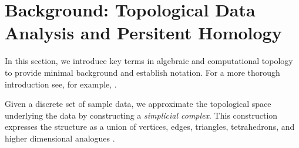 \section{Background: Topological Data Analysis and Persitent Homology}\label{background}
\label{sec:background}




In this section, we introduce key terms in algebraic and computational topology to provide minimal background and establish notation. For a more thorough introduction see, for example, \cite{Carlsson2009TopologyAD, hatcher2002algebraic, edelsbrunner2010computational, barcodeGhrist, persistenthomologyasurvey,TZH15}. 


Given a discrete set of sample data, we approximate the topological space underlying the data by constructing a \textit{simplicial complex}. This construction expresses the structure as a union of vertices, edges, triangles, tetrahedrons, and higher dimensional analogues  \cite{Carlsson2009TopologyAD}. 



